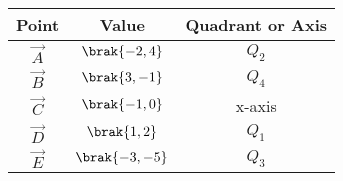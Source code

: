 \begin{tabular}[12pt]{ |c| c| c|} 
    \hline
    {Point} & {Value} & {Quadrant or Axis}\\ 
    \hline
    $ \vec{A} $ & $ \brak{-2,4} $ & $ Q_2 $ \\
    \hline 
    $ \vec{B} $ & $ \brak{3,-1} $ & $ Q_4 $ \\
    \hline
    $ \vec{C} $ & $ \brak{-1,0} $ & x-axis \\
    \hline   
    $ \vec{D} $ & $ \brak{1,2} $ & $ Q_1 $ \\
    \hline
    $ \vec{E} $ & $ \brak{-3,-5} $ &   $ Q_3 $ \\
    \hline
    \end{tabular}